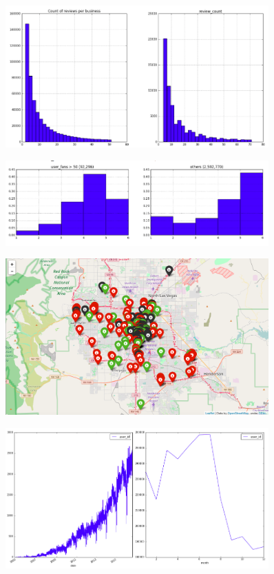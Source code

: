 \documentclass[11pt]{article}
\begin{document}
\begin{figure}[!htb]
\centering
\includegraphics[width=0.9\textwidth]{./ac209/countreviewshist.png}
\end{figure}

\begin{figure}[!htb]
\centering
\includegraphics[width=0.9\textwidth]{./ac209/lotsoffans.png}
\end{figure}

\begin{figure}[!htb]
\centering
\includegraphics[width=0.9\textwidth]{./ac209/mostreviewsbylocationlv.png}
\end{figure}

\begin{figure}[!htb]
\centering
\includegraphics[width=0.9\textwidth]{./ac209/timeseries.png}
\end{figure}
\end{document}
